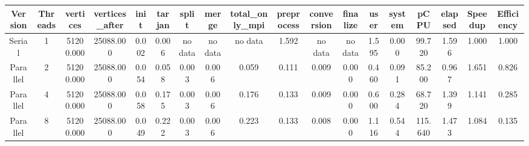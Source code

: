 \begin{tabular}{|c|c|c|c|c|c|c|c|c|c|c|c|c|c|c|c|c|c|}
\toprule
 Version &  Threads &  vertices &  vertices\_after &  init &  tarjan &   split &   merge & total\_only\_mpi &  preprocess & conversion & finalize &  user &  system &    pCPU &  elapsed &  Speedup &  Efficiency \\
\midrule
  Serial &        1 & 51200.000 &       25088.000 & 0.002 &   0.006 & no data & no data &        no data &       1.592 &    no data &  no data & 1.595 &   0.000 &  99.720 &    1.596 &    1.000 &       1.000 \\
Parallel &        2 & 51200.000 &       25088.000 & 0.054 &   0.058 &   0.003 &   0.006 &          0.059 &       0.111 &      0.009 &    0.000 & 0.460 &   0.091 &  85.200 &    0.967 &    1.651 &       0.826 \\
Parallel &        4 & 51200.000 &       25088.000 & 0.058 &   0.175 &   0.003 &   0.006 &          0.176 &       0.133 &      0.009 &    0.000 & 0.600 &   0.284 &  68.720 &    1.399 &    1.141 &       0.285 \\
Parallel &        8 & 51200.000 &       25088.000 & 0.049 &   0.222 &   0.003 &   0.006 &          0.223 &       0.133 &      0.008 &    0.000 & 1.116 &   0.544 & 115.640 &    1.473 &    1.084 &       0.135 \\
\bottomrule
\end{tabular}

